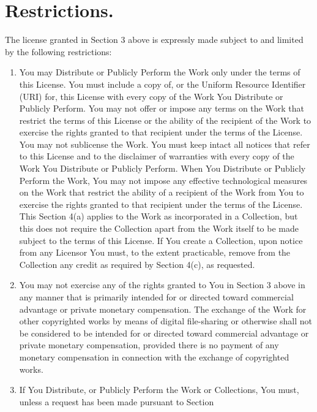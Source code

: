 \section{Restrictions.}
The license granted in Section 3 above is expressly made subject to and
limited by the following restrictions:

\begin{enumerate}
 \item You may Distribute or Publicly Perform the Work only under the
       terms of this License. You must include a copy of, or the Uniform
       Resource Identifier (URI) for, this License  with every copy of
       the Work You Distribute or Publicly Perform. You may not offer or
       impose any terms on the Work that restrict the terms of this
       License or the ability of the recipient of the Work to exercise
       the rights granted to that recipient under the terms of the
       License. You may not sublicense the Work. You must keep intact
       all notices that refer to this License and to the disclaimer of
       warranties with every copy of the Work You Distribute or Publicly
       Perform. When You Distribute or Publicly Perform the Work, You
       may not impose any effective technological measures on the Work
       that restrict the ability of a recipient of the Work from You to
       exercise the rights granted to that recipient under the terms of
       the License. This Section 4(a) applies to the Work as
       incorporated in a Collection, but this does not require the
       Collection apart from the Work itself to be made subject to the
       terms of this License. If You create a Collection, upon notice
       from any Licensor You must, to the extent practicable, remove
       from the Collection any credit as required by Section 4(c), as
       requested.
 \item You may not exercise any of the rights granted to You in Section
       3 above in any manner that is primarily intended for or directed
       toward commercial advantage or private monetary compensation. The
       exchange of the Work for other copyrighted works by means of
       digital file-sharing or otherwise shall not be considered to be
       intended for or directed toward commercial advantage or private
       monetary compensation, provided there is no payment of any
       monetary compensation in connection with the exchange of
       copyrighted works.
 \item If You Distribute, or Publicly Perform the Work or Collections,
       You must, unless a request has been made pursuant to Section

\end{enumerate}
